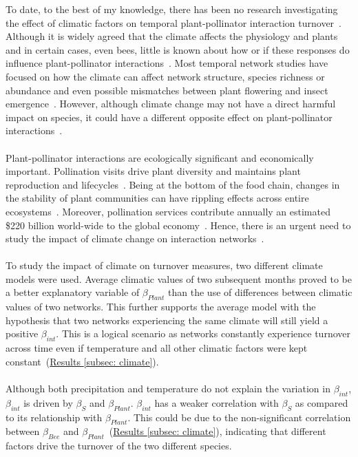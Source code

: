 \documentclass[11pt]{article}
\begin{document}
To date, to the best of my knowledge, there has been no research investigating the effect of climatic factors on temporal plant-pollinator interaction turnover~\citep{Burkle2011, Scaven2013}. Although it is widely agreed that the climate affects the physiology and plants and in certain cases, even bees, little is known about how or if these responses do influence plant-pollinator interactions~\citep{Hughes2000, Parmesan2003}. Most temporal network studies have focused on how the climate can affect network structure, species richness or abundance and even possible mismatches between plant flowering and insect emergence~\citep{BASILIO2006, Alarcon2008, MartinGonzalez2009, Schweiger2010}. However, although climate change may not have a direct harmful impact on species, it could have a different opposite effect on plant-pollinator interactions~\citep{Hegland2009, Scaven2013}. \\
\\
Plant-pollinator interactions are ecologically significant and economically important. Pollination visits drive plant diversity and maintains plant reproduction and lifecycles~\citep{Olesen2008}. Being at the bottom of the food chain, changes in the stability of plant communities can have rippling effects across entire ecosystems~\citep{Scaven2013}. Moreover, pollination services contribute annually an estimated \$220 billion world-wide to the global economy~\citep{Gallai2009}. Hence, there is an urgent need to study the impact of climate change on interaction networks~\citep{Scaven2013}. \\
\\
To study the impact of climate on turnover measures, two different climate models were used. Average climatic values of two subsequent months proved to be a better explanatory variable of $\beta_{Plant}$ than the use of differences between climatic values of two networks. This further supports the average model with the hypothesis that two networks experiencing the same climate will still yield a positive $\beta_{int}$. This is a logical scenario as networks constantly experience turnover across time even if temperature and all other climatic factors were kept constant~(\hyperref[subsec: climate]{Results \ref{subsec: climate}}).\\
\\
Although both precipitation and temperature do not explain the variation in $\beta_{int}$, $\beta_{int}$ is driven by $\beta_{S}$ and $\beta_{Plant}$. $\beta_{int}$ has a weaker correlation with $\beta_{S}$ as compared to its relationship with $\beta_{Plant}$. This could be due to the non-significant correlation between $\beta_{Bee}$ and $\beta_{Plant}$~(\hyperref[subsec: climate]{Results \ref{subsec: climate}}), indicating that different factors drive the turnover of the two different species. \\
\end{document}
